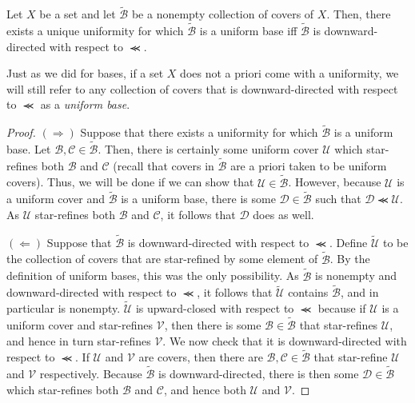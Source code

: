 \begin{prp}\label{prp4.3.2}
Let $X$ be a set and let $\widetilde{\mathcal{B}}$ be a nonempty collection of covers of $X$.  Then, there exists a unique uniformity for which $\widetilde{\mathcal{B}}$ is a uniform base iff $\widetilde{\mathcal{B}}$ is downward-directed with respect to $\llcurly$.
\begin{rmk}
Just as we did for bases, if a set $X$ does not a priori come with a uniformity, we will still refer to any collection of covers that is downward-directed with respect to $\llcurly$ as a \emph{uniform base}.
\end{rmk}
\begin{proof}
$(\Rightarrow )$ Suppose that there exists a uniformity for which $\widetilde{\mathcal{B}}$ is a uniform base.  Let $\mathcal{B},\mathcal{C}\in \widetilde{\mathcal{B}}$.  Then, there is certainly some uniform cover $\mathcal{U}$ which star-refines both $\mathcal{B}$ and $\mathcal{C}$ (recall that covers in $\widetilde{\mathcal{B}}$ are a priori taken to be uniform covers).  Thus, we will be done if we can show that $\mathcal{U}\in \widetilde{\mathcal{B}}$.  However, because $\mathcal{U}$ is a uniform cover and $\widetilde{\mathcal{B}}$ is a uniform base, there is some $\mathcal{D}\in \widetilde{\mathcal{B}}$ such that $\mathcal{D}\llcurly \mathcal{U}$.  As $\mathcal{U}$ star-refines both $\mathcal{B}$ and $\mathcal{C}$, it follows that $\mathcal{D}$ does as well.

\blankline
\noindent
$(\Leftarrow )$ Suppose that $\widetilde{\mathcal{B}}$ is downward-directed with respect to $\llcurly$.  Define $\widetilde{\mathcal{U}}$ to be the collection of covers that are star-refined by some element of $\widetilde{\mathcal{B}}$.  By the definition of uniform bases, this was the only possibility.  As $\widetilde{\mathcal{B}}$ is nonempty and downward-directed with respect to $\llcurly$, it follows that $\widetilde{\mathcal{U}}$ contains $\widetilde{\mathcal{B}}$, and in particular is nonempty.  $\widetilde{\mathcal{U}}$ is upward-closed with respect to $\llcurly$ because if $\mathcal{U}$ is a uniform cover and star-refines $\mathcal{V}$, then there is some $\mathcal{B}\in \widetilde{\mathcal{B}}$ that star-refines $\mathcal{U}$, and hence in turn star-refines $\mathcal{V}$.  We now check that it is downward-directed with respect to $\llcurly$.  If $\mathcal{U}$ and $\mathcal{V}$ are covers, then there are $\mathcal{B},\mathcal{C}\in \widetilde{\mathcal{B}}$ that star-refine $\mathcal{U}$ and $\mathcal{V}$ respectively.  Because $\widetilde{\mathcal{B}}$ is downward-directed, there is then some $\mathcal{D}\in \widetilde{\mathcal{B}}$ which star-refines both $\mathcal{B}$ and $\mathcal{C}$, and hence both $\mathcal{U}$ and $\mathcal{V}$.
\end{proof}
\end{prp}
